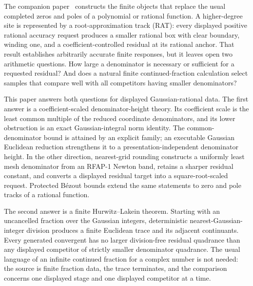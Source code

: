 \documentclass[11pt]{article}
\begin{document}
The companion paper~\cite{RFAPOne} constructs the finite objects that replace
the usual completed zeros and poles of a polynomial or rational function.  A
higher-degree site is represented by a root-approximation track (RAT): every
displayed positive rational accuracy request produces a smaller rational box
with clear boundary, winding one, and a coefficient-controlled residual at
its rational anchor.  That result establishes arbitrarily accurate finite
responses, but it leaves open two arithmetic questions.  How large a
denominator is necessary or sufficient for a requested residual?  And does a
natural finite continued-fraction calculation select samples that compare
well with all competitors having smaller denominators?

This paper answers both questions for displayed Gaussian-rational data.  The
first answer is a coefficient-scaled denominator-height theory.  Its
coefficient scale is the least common multiple of the reduced coordinate
denominators, and its lower obstruction is an exact Gaussian-integral norm
identity.  The common-denominator bound is attained by an explicit family;
an executable Gaussian Euclidean reduction strengthens it to a
presentation-independent denominator height.  In the
other direction, nearest-grid rounding constructs a uniformly least mesh
denominator from an RFAP-1 Newton band, retains a sharper residual constant,
and converts a displayed residual target into a square-root-scaled request.
Protected B\'ezout bounds extend the same statements to zero and pole tracks
of a rational function.

The second answer is a finite Hurwitz--Lakein theorem.  Starting with an
uncancelled fraction over the Gaussian integers, deterministic
nearest-Gaussian-integer division produces a finite Euclidean trace and its
adjacent continuants.  Every generated convergent has no larger
division-free residual quadrance than any displayed competitor of strictly
smaller denominator quadrance.  The usual language of an infinite continued
fraction for a complex number is not needed: the source is finite fraction
data, the trace terminates, and the comparison concerns one displayed stage
and one displayed competitor at a time.
\end{document}
